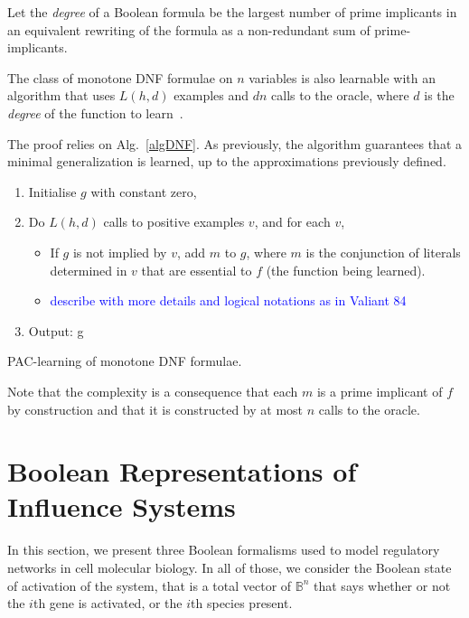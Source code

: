\documentclass{llncs}
\newcommand{\francois}[1]{\textcolor{blue}{#1}}
\begin{document}
Let the \emph{degree} of a Boolean formula be the largest number of prime
implicants in an equivalent rewriting of the formula as a non-redundant sum of
prime-implicants.


\begin{theorem}\label{thm:mdnf}
    The class of monotone DNF formulae on $n$ variables is also learnable with an
    algorithm that uses $L(h,d)$ examples and $d n$ calls to the oracle,
    where $d$ is the \emph{degree} of the function to learn~\cite{Valiant84cacm}.
\end{theorem}

The proof relies on Alg.~\ref{algDNF}. As previously, the algorithm guarantees that a minimal generalization is learned, up to the approximations previously defined.

\begin{algorithm}
\begin{enumerate}
\item Initialise $g$ with constant zero,
\item
Do $L(h,d)$ calls to positive examples $v$, and for each $v$,
\begin{itemize}
	\item 
	If $g$ is not implied by $v$, add $m$ to $g$, where $m$ is the conjunction
   of literals determined in $v$ that are essential to $f$ (the function being
   learned).
\item \francois{describe with more details and logical notations as in Valiant 84}
\end{itemize}
\item Output: g
\end{enumerate}
\caption{PAC-learning of monotone DNF formulae.\label{algDNF}}
\end{algorithm}

Note that the complexity is a consequence that each $m$ is a prime implicant
of $f$ by construction and that it is constructed by at most $n$ calls to the
oracle.



\section{Boolean Representations of Influence Systems}

In this section, we present three Boolean formalisms used to model regulatory networks in cell molecular biology.
In all of those, we consider the Boolean state of activation of the system, that is a total vector of $\mathbb{B}^n$ that says whether or not the $i$th gene is activated, or the $i$th species present. 
\end{document}
